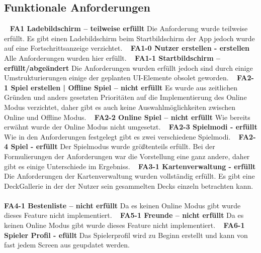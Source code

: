 \documentclass{scrartcl}
\begin{document}
\subsection{Funktionale Anforderungen}
\ \newline
\textbf{FA1 Ladebildschirm – teilweise erfüllt} \newline
Die Anforderung wurde teilweise erfüllt. Es gibt einen Ladebildschirm beim Startbildschirm der App jedoch wurde auf eine Fortschrittsanzeige verzichtet.
\ \newline
\textbf{FA1-0 Nutzer erstellen - erstellen} \newline
Alle Anforderungen wurden hier erfüllt. 
\ \newline
\textbf{FA1-1 Startbildschirm – erfüllt/abgeändert} \newline
Die Anforderungen wurden erfüllt jedoch sind durch einige Umstrukturierungen einige der geplanten UI-Elemente obsolet geworden.
\ \newline
\textbf{FA2-1 Spiel erstellen | Offline Spiel – nicht erfüllt} \newline
Es wurde aus zeitlichen Gründen und anders gesetzten Prioritäten auf die Implementierung des Online Modus verzichtet, daher gibt es auch keine Auswahlmöglichkeiten zwischen Online und Offline Modus.
\ \newline
\textbf{FA2-2 Online Spiel – nicht erfüllt} \newline
Wie bereits erwähnt wurde der Online Modus nicht umgesetzt.
\ \newline
\textbf{FA2-3 Spielmodi - erfüllt} \newline
Wie in den Anforderungen festgelegt gibt es zwei verschiedene Spielmodi. 
\ \newline
\textbf{FA2-4 Spiel - erfüllt} \newline
Der Spielmodus wurde größtenteils erfüllt. Bei der Formulierungen der Anforderungen war die Vorstellung eine ganz andere, daher gibt es einige Unterschiede im Ergebniss.
\ \newline
\textbf{FA3-1 Kartenverwaltung  - erfüllt} \newline
Die Anforderungen der Kartenverwaltung wurden vollständig erfüllt. Es gibt eine DeckGallerie in der der Nutzer sein gesammelten Decks einzeln betrachten kann. 
\ \newline\\
\textbf{FA4-1 Bestenliste – nicht erfüllt} \newline
Da es keinen Online Modus gibt wurde dieses Feature nicht implementiert.
\ \newline
\textbf{FA5-1 Freunde – nicht erfüllt} \newline
Da es keinen Online Modus gibt wurde dieses Feature nicht implementiert.
\ \newline
\textbf{FA6-1 Spieler Profil - efüllt} \newline
Das Spielerprofil wird zu Beginn erstellt und kann von fast jedem Screen aus geupdatet werden.
\ \newline
\end{document}
